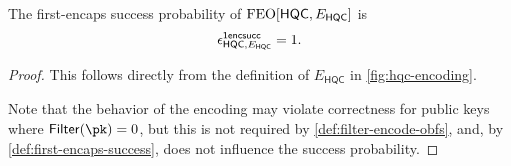 \begin{lemma}
\label{lem:hqc-first-encaps-success}
    The first-encaps success probability of $\textsf{\textnormal{FEO}}[\mathsf{HQC}, E_\mathsf{HQC}]$ is
    \[ \epsilon^{\mathsf{1encsucc}}_{\mathsf{HQC}, E_\mathsf{HQC}} = 1. \]
\end{lemma}
\begin{proof}
    This follows directly from the definition of $E_\mathsf{HQC}$ in \cref{fig:hqc-encoding}.

    Note that the behavior of the encoding may violate correctness for public keys where $\mathsf{Filter}(\pk) = 0$, but this is not required by \cref{def:filter-encode-obfs}, and, by \cref{def:first-encaps-success}, does not influence the success probability. 
\end{proof}


